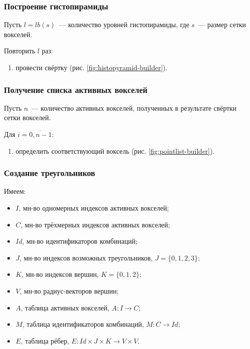 \subsubsection{Построение гистопирамиды}
Пусть $l=lb(s)$~--- количество уровней гистопирамиды, где $s$~--- размер сетки вокселей.

Повторить $l$ раз:
\begin{enumerate}
  \item провести свёртку (рис. \ref{fig:histopyramid-builder}).
\end{enumerate}


\subsubsection{Получение списка активных вокселей}
Пусть $n$~--- количество активных вокселей, полученных в результате свёртки сетки вокселей.

Для $i=\overline{0,n-1}$:
\begin{enumerate}
  \item определить соответствующий воксель (рис. \ref{fig:pointlist-builder}).
\end{enumerate}


\subsubsection{Создание треугольников}
Имеем:
\begin{itemize}
  \item $I$, мн-во одномерных индексов активных вокселей;
  \item $C$, мн-во трёхмерных индексов активных вокселей;
  \item $Id$, мн-во идентификаторов комбинаций;
  \item $J$, мн-во индексов возможных треугольников, $J=\{0,1,2,3\}$;
  \item $K$, мн-во индексов вершин, $K=\{0,1,2\}$;
  \item $V$, мн-во радиус-векторов вершин;
  \item $A$, таблица активных вокселей, $A: I \to C$;
  \item $M$, таблица идентификаторов комбинаций, $M: C \to Id$;
  \item $E$, таблица рёбер, $E: Id\times J\times K \to V\times V$.
\end{itemize}

